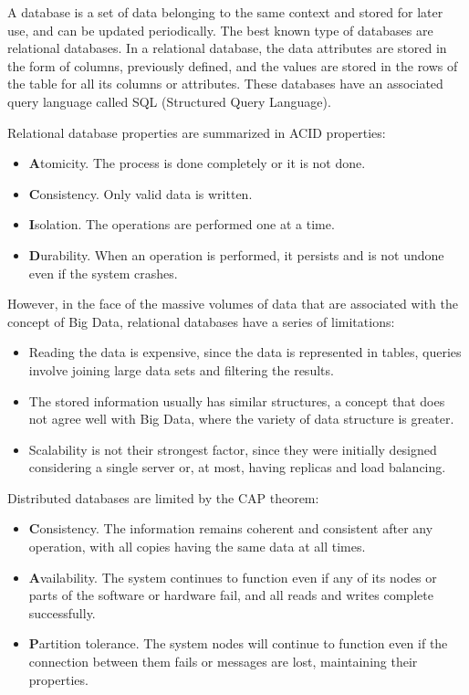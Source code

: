 \nonzeroparskip A database is a set of data belonging to the same context and stored for later use, and can be updated periodically. The best known type of databases are relational databases. In a relational database, the data attributes are stored in the form of columns, previously defined, and the values are stored in the rows of the table for all its columns or attributes. These databases have an associated query language called SQL (Structured Query Language).

\nonzeroparskip Relational database properties are summarized in ACID properties:
\begin{itemize}
	\item \textbf{A}tomicity. The process is done completely or it is not done.
	\item \textbf{C}onsistency. Only valid data is written.
	\item \textbf{I}solation. The operations are performed one at a time.
	\item \textbf{D}urability. When an operation is performed, it persists and is not undone even if the system crashes.
\end{itemize}

\nonzeroparskip However, in the face of the massive volumes of data that are associated with the concept of Big Data, relational databases have a series of limitations:
\begin{itemize}
	\item Reading the data is expensive, since the data is represented in tables, queries involve joining large data sets and filtering the results.
	\item The stored information usually has similar structures, a concept that does not agree well with Big Data, where the variety of data structure is greater.
	\item Scalability is not their strongest factor, since they were initially designed considering a single server or, at most, having replicas and load balancing.
\end{itemize}

\nonzeroparskip Distributed databases are limited by the CAP theorem:
\begin{itemize}
	\item \textbf{C}onsistency. The information remains coherent and consistent after any operation, with all copies having the same data at all times.
	\item \textbf{A}vailability. The system continues to function even if any of its nodes or parts of the software or hardware fail, and all reads and writes complete successfully.
	\item \textbf{P}artition tolerance. The system nodes will continue to function even if the connection between them fails or messages are lost, maintaining their properties.
\end{itemize}

